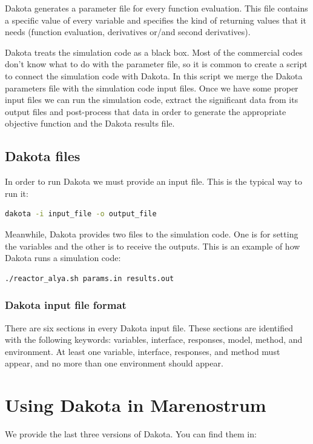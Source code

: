 \documentclass[12pt,a4paper,article]{memoir} %
\begin{document}
Dakota generates a parameter file for every function evaluation. This file contains a specific value of every variable and specifies the kind of returning values that it needs (function evaluation, derivatives or/and second derivatives).

Dakota treats the simulation code as a black box. Most of the commercial codes don't know what to do with the parameter file, so it is common to create a script to connect the simulation code with Dakota. In this script we merge the Dakota parameters file with the simulation code input files. Once we have some proper input files we can run the simulation code, extract the significant data from its output files and post-process that data in order to generate the appropriate objective function and the Dakota results file.

\section{Dakota files}

In order to run Dakota we must provide an input file. This is the typical way to run it:

\begin{lstlisting}[style=MyCodeStyle,language=bash]
dakota -i input_file -o output_file
\end{lstlisting}

Meanwhile, Dakota provides two files to the simulation code. One is for setting the variables and the other is to receive the outputs. This is an example of how Dakota runs a simulation code:

\begin{lstlisting}[style=MyCodeStyle,language=bash]
./reactor_alya.sh params.in results.out
\end{lstlisting}

\subsection{Dakota input file format}

There are six sections in every Dakota input file. These sections are identified with the following keywords: variables, interface, responses, model, method, and environment. At least one variable, interface, responses, and method must appear, and no more than one environment should appear.

\chapter{Using Dakota in Marenostrum}
We provide the last three versions of Dakota. You can find them in:
\end{document}
